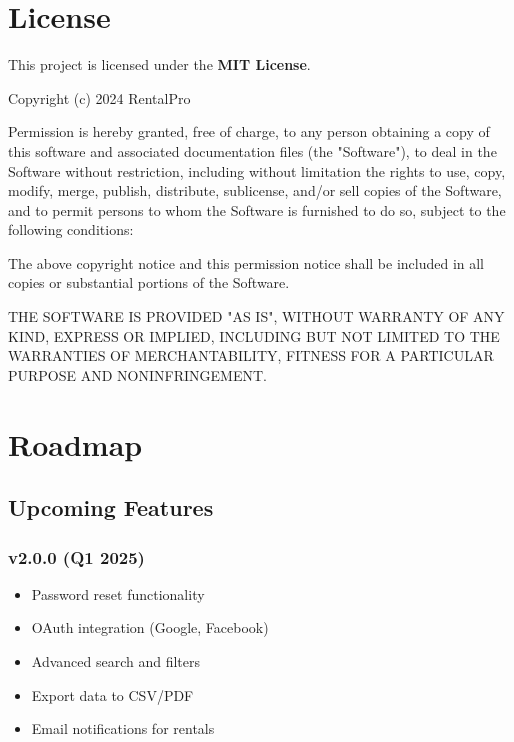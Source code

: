 \documentclass[12pt,a4paper]{article}
\begin{document}
\section{License}

This project is licensed under the \textbf{MIT License}.

\begin{tcolorbox}[colback=yellow!5!white,colframe=yellow!50!black,title=MIT License]
Copyright (c) 2024 RentalPro

Permission is hereby granted, free of charge, to any person obtaining a copy of this software and associated documentation files (the "Software"), to deal in the Software without restriction, including without limitation the rights to use, copy, modify, merge, publish, distribute, sublicense, and/or sell copies of the Software, and to permit persons to whom the Software is furnished to do so, subject to the following conditions:

The above copyright notice and this permission notice shall be included in all copies or substantial portions of the Software.

THE SOFTWARE IS PROVIDED "AS IS", WITHOUT WARRANTY OF ANY KIND, EXPRESS OR IMPLIED, INCLUDING BUT NOT LIMITED TO THE WARRANTIES OF MERCHANTABILITY, FITNESS FOR A PARTICULAR PURPOSE AND NONINFRINGEMENT.
\end{tcolorbox}

\section{Roadmap}

\subsection{Upcoming Features}

\subsubsection{v2.0.0 (Q1 2025)}
\begin{itemize}
    \item Password reset functionality
    \item OAuth integration (Google, Facebook)
    \item Advanced search and filters
    \item Export data to CSV/PDF
    \item Email notifications for rentals
\end{itemize}
\end{document}
